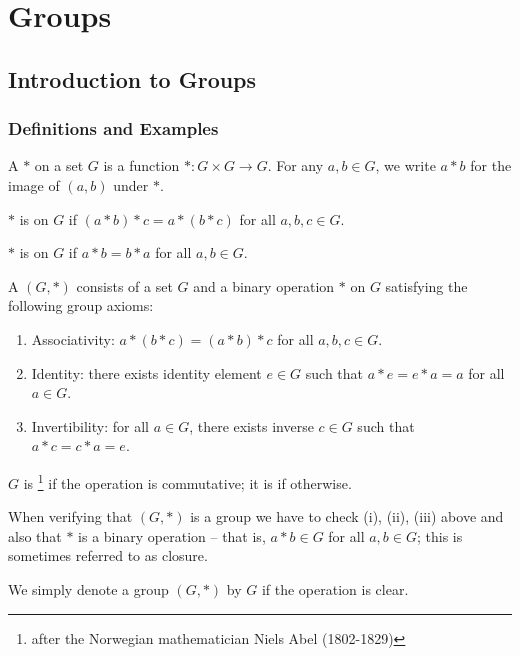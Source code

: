 \chapter{Groups}\label{chap:groups}
\section{Introduction to Groups}
\subsection{Definitions and Examples}
\begin{definition}
A  $\ast$ on a set $G$ is a function $\ast:G\times G\to G$. For any $a,b\in G$, we write $a \ast b$ for the image of $(a,b)$ under $\ast$.

$\ast$ is  on $G$ if $(a\ast b)\ast c=a\ast(b\ast c)$ for all $a,b,c\in G$.

$\ast$ is  on $G$ if $a\ast b=b\ast a$ for all $a,b\in G$.
\end{definition}

\begin{definition}[Group]
A  $(G,\ast)$ consists of a set $G$ and a binary operation $\ast$ on $G$ satisfying the following group axioms:
\begin{enumerate}[label=(\roman*)]
\item Associativity: $a\ast(b\ast c)=(a\ast b)\ast c$ for all $a,b,c\in G$.
\item Identity: there exists identity element $e\in G$ such that $a\ast e=e\ast a=a$ for all $a\in G$.
\item Invertibility: for all $a\in G$, there exists inverse $c\in G$ such that $a\ast c=c\ast a=e$.
\end{enumerate}

$G$ is \footnote{after the Norwegian mathematician Niels
Abel (1802-1829)} if the operation is commutative; it is  if otherwise.
\end{definition}

\begin{remark}
When verifying that $(G,\ast)$ is a group we have to check (i), (ii), (iii) above and also that $\ast$ is a binary operation -- that is, $a\ast b\in G$ for all $a,b\in G$; this is sometimes referred to as closure.
\end{remark}

\begin{notation}
We simply denote a group $(G,\ast)$ by $G$ if the operation is clear.
\end{notation}

